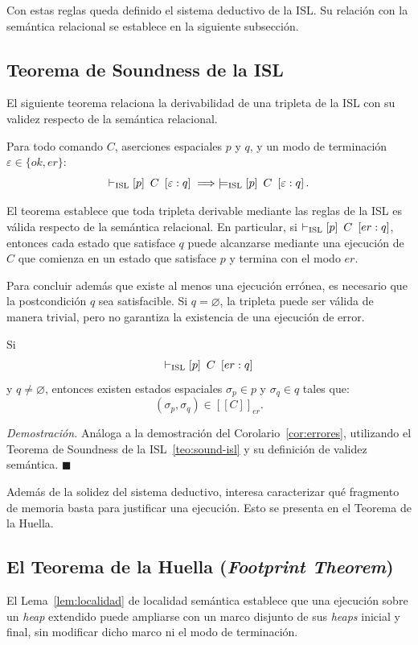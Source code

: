 \documentclass[a4paper,	11pt]{report}
\begin{document}
Con estas reglas queda definido el sistema deductivo de la ISL.
Su relación con la semántica relacional se establece en la siguiente subsección.

\subsection*{Teorema de Soundness de la ISL}
El siguiente teorema relaciona la derivabilidad de una tripleta de la ISL con su validez respecto de la semántica relacional.

\begin{teorema}
\label{teo:sound-isl}
Para todo comando $C$, aserciones espaciales $p$ y $q$,
y un modo de terminación $\varepsilon \in \{ok, er\}$:
$$\vdash_{\mathrm{ISL}} \left\lbrack p \right\rbrack~C~\left\lbrack \varepsilon : q \right\rbrack \implies \models_{\mathrm{ISL}} \left\lbrack p \right\rbrack~C~\left\lbrack \varepsilon : q \right\rbrack.$$
\end{teorema}

El teorema establece que toda tripleta derivable mediante las reglas de la ISL
es válida respecto de la semántica relacional.
En particular,
si $\vdash_{\mathrm{ISL}} \left\lbrack p \right\rbrack~C~\left\lbrack er : q \right\rbrack$,
entonces cada estado que satisface $q$ puede alcanzarse mediante una ejecución de $C$
que comienza en un estado que satisface $p$ y termina con el modo $er$.

Para concluir además que existe al menos una ejecución errónea,
es necesario que la postcondición $q$ sea satisfacible.
Si $q = \varnothing$,
la tripleta puede ser válida de manera trivial,
pero no garantiza la existencia de una ejecución de error.

\begin{corolario}
\label{cor:errores-isl}
Si
$$\vdash_{\mathrm{ISL}} \left\lbrack p \right\rbrack~C~\left\lbrack er : q \right\rbrack$$
y $q \neq \varnothing$, entonces existen estados espaciales $\sigma_p \in p$ y $\sigma_q \in q$ tales que:
$$(\sigma_p, \sigma_q) \in [\![C]\!]_{er}.$$
\end{corolario}
\emph{Demostración.} Análoga a la demostración del Corolario~\ref{cor:errores},
utilizando el Teorema de Soundness de la ISL~\ref{teo:sound-isl} y su definición de validez semántica.
$\ensuremath{\blacksquare}$

Además de la solidez del sistema deductivo,
interesa caracterizar qué fragmento de memoria basta para justificar una ejecución.
Esto se presenta en el Teorema de la Huella.

\subsection*{El Teorema de la Huella (\textit{Footprint Theorem})}
El Lema~\ref{lem:localidad} de localidad semántica establece que una ejecución sobre un \emph{heap} extendido
puede ampliarse con un marco disjunto de sus \emph{heaps} inicial y final,
sin modificar dicho marco ni el modo de terminación.
\end{document}
